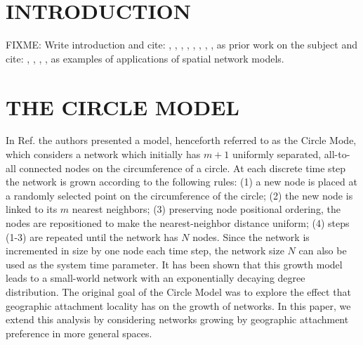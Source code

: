\documentclass[aps,pre,reprint,superscriptaddress,amsmath,amssymb,nofootinbib]{revtex4-1}
\begin{document}

\maketitle

\section{INTRODUCTION}
FIXME: Write introduction and cite:
\cite{wsnat}, \cite{ozik2004}, \cite{przuljgeo}, \cite{hermannspace}, \cite{bullockspatial}, \cite{guan1D}, \cite{zhang2006}, \cite{zhang2007}, \cite{newmanreview}  as prior work on the subject and cite:
\cite{neuronembedding}, \cite{plenzcascade}, \cite{fruitfly}, \cite{barthelemy}, \cite{vazquez2002} as examples of applications of spatial network models.

\section{THE CIRCLE MODEL}
In Ref. \cite{ozik2004} the authors presented a model, henceforth referred to as the Circle Mode, which considers a network which initially has $m+1$ uniformly separated, all-to-all connected nodes on the circumference of a circle. 
At each discrete time step the network is grown according to the following rules: 
(1) a new node is placed at a randomly selected point on the circumference of the circle;
(2) the new node is linked to its $m$ nearest neighbors;
(3) preserving node positional ordering, the nodes are repositioned to make the nearest-neighbor distance uniform;
(4) steps (1-3) are repeated until the network has $N$ nodes.
Since the network is incremented in size by one node each time step, the network size $N$ can also be used as the system time parameter.  
It has been shown \cite{ozik2004} that this growth model leads to a small-world network with an exponentially decaying degree distribution. 
The original goal of the Circle Model was to explore the effect that geographic attachment locality has on the growth of networks.
In this paper, we extend this analysis by considering networks growing by geographic attachment preference in more general spaces. 
\end{document}
